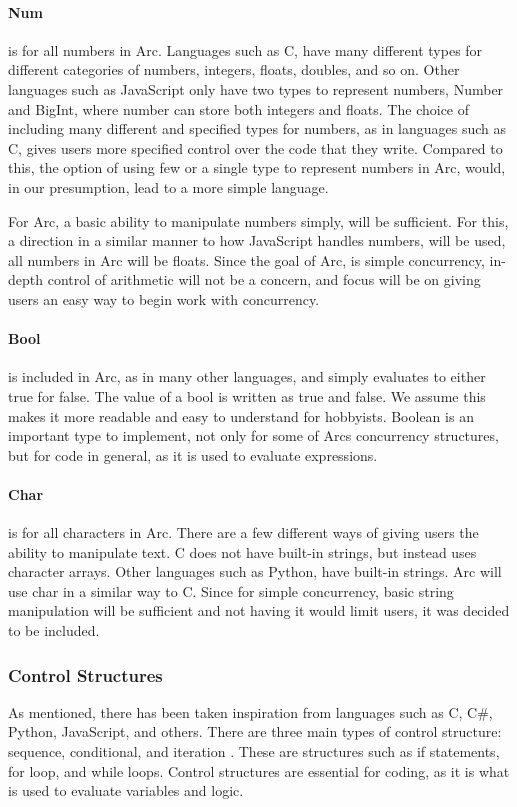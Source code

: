 \paragraph{Num} is for all numbers in Arc. Languages such as C, have many different types for different categories of numbers, integers, floats, doubles, and so on. Other languages such as JavaScript only have two types to represent numbers, Number and BigInt, where number can store both integers and floats.
The choice of including many different and specified types for numbers, as in languages such as C, gives users more specified control over the code that they write.
Compared to this, the option of using few or a single type to represent numbers in Arc, would, in our presumption, lead to a more simple language.

For Arc, a basic ability to manipulate numbers simply, will be sufficient. For this, a direction in a similar manner to how JavaScript handles numbers, will be used, all numbers in Arc will be floats. Since the goal of Arc, is simple concurrency, in-depth control of arithmetic will not be a concern, and focus will be on giving users an easy way to begin work with concurrency.

\paragraph{Bool} is included in Arc, as in many other languages, and simply evaluates to either true for false. The value of a bool is written as true and false. We assume this makes it more readable and easy to understand for hobbyists. Boolean is an important type to implement, not only for some of Arcs concurrency structures, but for code in general, as it is used to evaluate expressions.

\paragraph{Char} is for all characters in Arc. There are a few different ways of giving users the ability to manipulate text. C does not have built-in strings, but instead uses character arrays. Other languages such as Python, have built-in strings. Arc will use char in a similar way to C. Since for simple concurrency, basic string manipulation will be sufficient and not having it would limit users, it was decided to be included.


\subsubsection{Control Structures}
As mentioned, there has been taken inspiration from languages such as C, C\#, Python, JavaScript, and others. There are three main types of control structure: sequence, conditional, and iteration \cite*{CBook}. These are structures such as if statements, for loop, and while loops. Control structures are essential for coding, as it is what is used to evaluate variables and logic.

